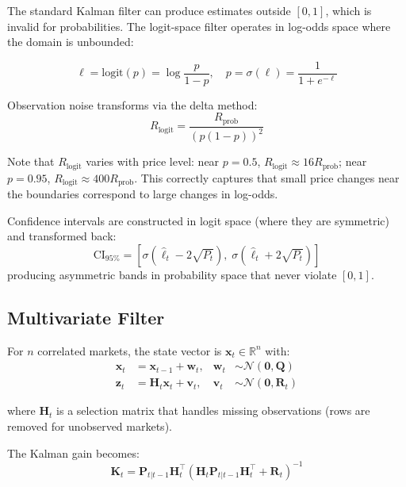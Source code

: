 \documentclass[11pt, a4paper]{article}
\begin{document}
The standard Kalman filter can produce estimates outside $[0,1]$, which is invalid for probabilities. The logit-space filter operates in log-odds space where the domain is unbounded:

\begin{equation}
    \ell = \text{logit}(p) = \log \frac{p}{1-p}, \quad p = \sigma(\ell) = \frac{1}{1 + e^{-\ell}}
\end{equation}

Observation noise transforms via the delta method:
\begin{equation}
    R_{\text{logit}} = \frac{R_{\text{prob}}}{\left(p(1-p)\right)^2}
    \label{eq:delta}
\end{equation}

Note that $R_{\text{logit}}$ varies with price level: near $p = 0.5$, $R_{\text{logit}} \approx 16 R_{\text{prob}}$; near $p = 0.95$, $R_{\text{logit}} \approx 400 R_{\text{prob}}$. This correctly captures that small price changes near the boundaries correspond to large changes in log-odds.

Confidence intervals are constructed in logit space (where they are symmetric) and transformed back:
\begin{equation}
    \text{CI}_{95\%} = \left[\sigma(\hat{\ell}_t - 2\sqrt{P_t}), \; \sigma(\hat{\ell}_t + 2\sqrt{P_t})\right]
\end{equation}
producing asymmetric bands in probability space that never violate $[0,1]$.

\subsection{Multivariate Filter}

For $n$ correlated markets, the state vector is $\mathbf{x}_t \in \mathbb{R}^n$ with:
\begin{align}
    \mathbf{x}_t &= \mathbf{x}_{t-1} + \mathbf{w}_t, & \mathbf{w}_t &\sim \mathcal{N}(\mathbf{0}, \mathbf{Q}) \\
    \mathbf{z}_t &= \mathbf{H}_t \mathbf{x}_t + \mathbf{v}_t, & \mathbf{v}_t &\sim \mathcal{N}(\mathbf{0}, \mathbf{R}_t)
\end{align}

where $\mathbf{H}_t$ is a selection matrix that handles missing observations (rows are removed for unobserved markets).

The Kalman gain becomes:
\begin{equation}
    \mathbf{K}_t = \mathbf{P}_{t|t-1} \mathbf{H}_t^\top \left(\mathbf{H}_t \mathbf{P}_{t|t-1} \mathbf{H}_t^\top + \mathbf{R}_t\right)^{-1}
\end{equation}
\end{document}
